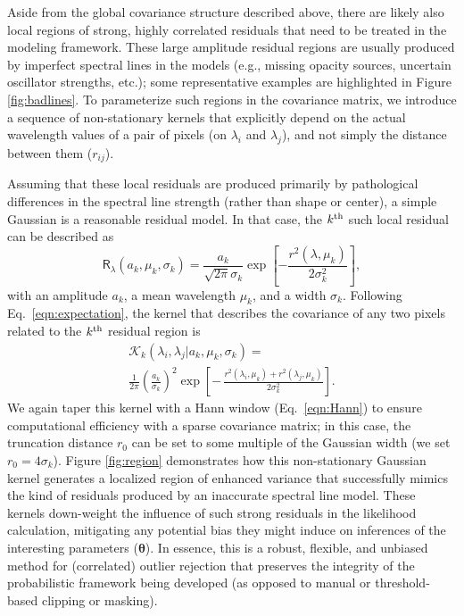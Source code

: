 \documentclass[iop,floatfix]{emulateapj}
\newcommand{\vt}{ {\bm \theta}}
\newcommand{\vR}{\mathsf{R}}
\newcommand{\vt}{ {\bm \theta}}
\newcommand{\stellarParameters}{\vt}
\newcommand{\KK}{\mathcal{K}}
\newcommand{\Klocal}{\KK_k}
\begin{document}
Aside from the global covariance structure described above, there are likely also local regions of 
strong, highly correlated residuals that need to be treated in the modeling framework.  These large 
amplitude residual regions are usually produced by imperfect spectral lines in the models (e.g., 
missing opacity sources, uncertain oscillator strengths, etc.); some representative examples are 
highlighted in Figure \ref{fig:badlines}.  To parameterize such regions in the covariance matrix, 
we introduce a sequence of non-stationary kernels that explicitly depend on the actual wavelength 
values of a pair of pixels (on $\lambda_i$ and $\lambda_j$), and not simply the distance between 
them ($r_{ij}$).  

Assuming that these local residuals are produced primarily by pathological differences in the 
spectral line strength (rather than shape or center), a simple Gaussian is a reasonable residual 
model.  In that case, the $k^{\rm th}$ such local residual can be described as
\begin{equation}
\vR_{\lambda}(a_k, \mu_k, \sigma_k) = \frac{a_k}{\sqrt{2\pi}{\sigma_k}} \exp \left[ - \frac{r^2(\lambda,\mu_k)}{2\sigma_k^2} \right],
\end{equation}
with an amplitude $a_k$, a mean wavelength $\mu_k$, and a width $\sigma_k$.  Following 
Eq.~\ref{eqn:expectation}, the kernel that describes the covariance of any two pixels related to 
the $k^{\rm th}$ residual region is
\begin{multline}
  \Klocal(\lambda_i, \lambda_j | a_k, \mu_k, \sigma_k) = \\
  \frac{1}{2\pi} \left(\frac{a_k}{\sigma_k}\right)^2 \exp \left [ - \, \frac{r^2(\lambda_i, \mu_k) + r^2(\lambda_j, \mu_k)}{2 \sigma_k^2}\right ].
\label{eqn:klocal}
\end{multline}
We again taper this kernel with a Hann window (Eq.~\ref{eqn:Hann}) to ensure computational 
efficiency with a sparse covariance matrix; in this case, the truncation distance $r_0$ can be set 
to some multiple of the Gaussian width (we set $r_0 = 4\sigma_k$).  Figure \ref{fig:region} 
demonstrates how this non-stationary Gaussian kernel generates a localized region of enhanced 
variance that successfully mimics the kind of residuals produced by an inaccurate spectral line 
model.  These kernels down-weight the influence of such strong residuals in the likelihood 
calculation, mitigating any potential bias they might induce on inferences of the interesting 
parameters ($\stellarParameters$).  In essence, this is a robust, flexible, and unbiased method for (correlated) 
outlier rejection that preserves the integrity of the probabilistic framework being developed (as 
opposed to manual or threshold-based clipping or masking).  
\end{document}

